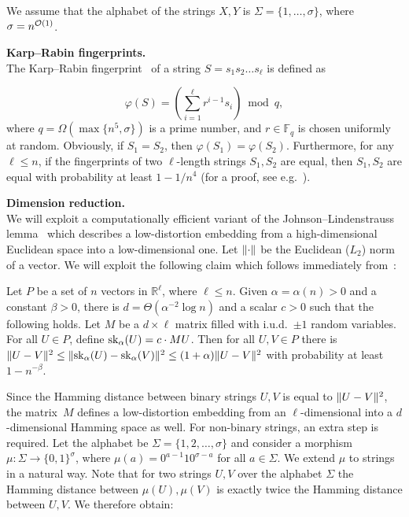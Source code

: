 We assume that the alphabet of the strings $X, Y$ is $\Sigma = \{1,\ldots,\sigma\}$, where $\sigma = n^{\mathcal{O}(1)}$.


\noindent\textbf{Karp--Rabin fingerprints. }\\
\noindent The Karp--Rabin fingerprint~\cite{DBLP:journals/ibmrd/KarpR87} of a string $S = s_1 s_2 \dots s_\ell$ is defined as

$$\varphi(S) = \left(\sum_{i = 1}^{\ell} r^{i-1} s_i\right) \bmod q,$$ 
%
where $q = \Omega(\max\{n^5, \sigma\})$ is a prime number, and $r \in \mathbb{F}_q$ is chosen uniformly at random.  Obviously, if $S_1 = S_2$, then $\varphi(S_1) = \varphi(S_2)$. Furthermore, for any $\ell \le n$, if the fingerprints of two $\ell$-length strings $S_1, S_2$ are equal, then $S_1, S_2$ are equal with probability at least $1-1/n^4$ (for a proof, see e.g.~\cite{Porat:09}).


\noindent\textbf{Dimension reduction.}\\
\noindent We will exploit a computationally efficient variant of the Johnson--Lindenstrauss lemma~\cite{MR737400} which describes a low-distortion embedding from a high-dimensional Euclidean space into a low-dimensional one. Let $\lVert\cdot\rVert$ be the Euclidean ($L_2$) norm of a vector. We will exploit the following claim which follows immediately from~\cite[Theorem 1.1]{ACHLIOPTAS2003671}:
 
\begin{lemma}\label{lm:dim_reduction}
Let $P$ be a set of $n$ vectors in $\mathbb{R}^{\ell}$, where $\ell \le n$. Given $\alpha = \alpha(n) > 0$ and a constant $\beta > 0$, there is $d = \Theta(\alpha^{-2}\log n)$ and a scalar $c > 0$ such that the following holds. Let $M$ be a $d \times \ell$ matrix filled with i.u.d.\ $\pm1$ random variables. For all $U \in P$, define $\mathrm{sk}_\alpha (U) = c \cdot M U$. Then for all $U,V \in P$ there is $\lVert U-V\rVert^2 \leq \lVert\mathrm{sk}_\alpha(U)-\mathrm{sk}_\alpha(V)\rVert^2 \leq (1+\alpha) \lVert U-V\rVert^2$ with probability at least $1- n^{-\beta}$. 
\end{lemma}

Since the Hamming distance between binary strings $U, V$ is equal to $\lVert U-V\rVert^2$, the matrix~$M$ defines a low-distortion embedding from an $\ell$-dimensional into a $d$-dimensional Hamming space as well. For non-binary strings, an extra step is required. Let the alphabet be $\Sigma = \{1, 2, \ldots, \sigma\}$ and consider a morphism $\mu : \Sigma \rightarrow \{0,1\}^\sigma$, where $\mu(a) = 0^{a-1} 1 0^{\sigma-a}$ for all $a \in \Sigma$. We extend $\mu$ to strings in a natural way. Note that for two strings $U, V$ over the alphabet $\Sigma$ the Hamming distance between $\mu(U), \mu(V)$ is exactly twice the Hamming distance between $U, V$. We therefore obtain:

